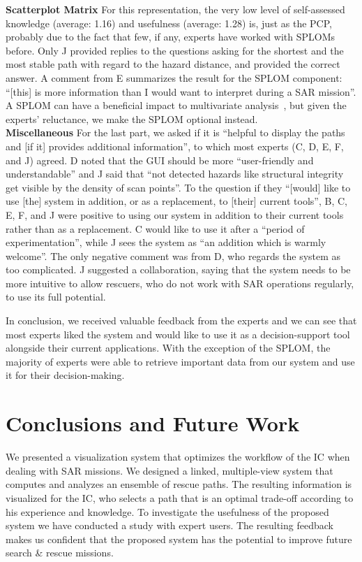 \documentclass{egpubl}
\begin{document}
%
\textbf{Scatterplot Matrix} For this representation, the very low level of self-assessed knowledge (average: 1.16) and usefulness (average: 1.28) is, just as the PCP, probably due to the fact that few, if any, experts have worked with SPLOMs before. Only J provided replies to the questions asking for the shortest and the most stable path with regard to the hazard distance, and provided the correct answer. A comment from E summarizes the result for the SPLOM component: ``[this] is more information than I would want to interpret during a SAR mission''. A SPLOM can have a beneficial impact to multivariate analysis~\cite{6064985}, but given the experts' reluctance, we make the SPLOM optional instead.\\
%
\noindent \textbf{Miscellaneous} For the last part, we asked if it is ``helpful to display the paths and [if it] provides additional information'', to which most experts (C, D, E, F, and J) agreed. D noted that the GUI should be more ``user-friendly and understandable'' and J said that ``not detected hazards like structural integrity get visible by the density of scan points''. To the question if they ``[would] like to use [the] system in addition, or as a replacement, to [their] current tools'', B, C, E, F, and J were positive to using our system in addition to their current tools rather than as a replacement. C would like to use it after a ``period of experimentation'', while J sees the system as ``an addition which is warmly welcome''. The only negative comment was from D, who regards the system as too complicated. J suggested a collaboration, saying that the system needs to be more intuitive to allow rescuers, who do not work with SAR operations regularly, to use its full potential.

In conclusion, we received valuable feedback from the experts and we can see that most experts liked the system and would like to use it as a decision-support tool alongside their current applications. With the exception of the SPLOM, the majority of experts were able to retrieve important data from our system and use it for their decision-making.


\section{Conclusions and Future Work} \label{sec:conclusion}
We presented a visualization system that optimizes the workflow of the IC when dealing with SAR missions. We designed a linked, multiple-view system that computes and analyzes an ensemble of rescue paths. The resulting information is visualized for the IC, who selects a path that is an optimal trade-off according to his experience and knowledge. To investigate the usefulness of the proposed system we have conducted a study with expert users. The resulting feedback makes us confident that the proposed system has the potential to improve future search \& rescue missions.
\end{document}
